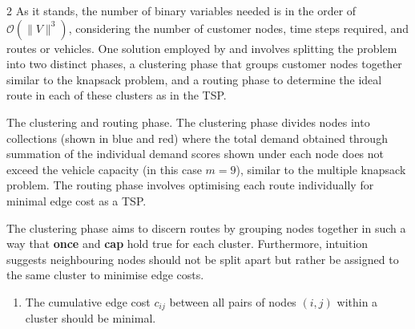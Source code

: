 \documentclass [10pt]{article}
\newcommand {\qnorm}[1] {\lVert #1 \rVert}
\begin{document}
\begin {multicols}{2}
As it stands, the number of binary variables needed is in the order of
$\mathcal{O}(\qnorm{V}^3)$, considering the number of customer nodes, time
steps required, and routes or vehicles. One solution employed by
\cite{cvrpanneal} and \cite{cvrpqaoa} involves splitting the problem
into two distinct phases, a clustering phase that groups customer nodes
together similar to the knapsack problem, and a routing phase to determine the
ideal route in each of these clusters as in the TSP.

\vspace {0.3cm}
\begin {center}

	{
	The clustering and routing phase. The clustering phase divides nodes into
	collections (shown in blue and red) where the total demand obtained 
	through summation of the individual demand scores shown under
	each node does not exceed the vehicle capacity (in this case $m = 9$),
	similar to the multiple knapsack problem. The routing phase involves
	optimising each route individually for minimal edge cost as a TSP.
}
\end {center}
\vspace {0.3cm}

The clustering phase aims to discern routes by grouping nodes together in such
a way that \textbf{once} and \textbf{cap} hold true for each cluster.
Furthermore, intuition suggests neighbouring nodes should not be split apart
but rather be assigned to the same cluster to minimise edge costs.
\begin {enumerate}[label=\textbf{cluster}, align=left]
\item The cumulative edge cost $c_{ij}$ between all pairs of
	nodes $(i, j)$ within a cluster should be minimal.
\end {enumerate}


\end{multicols}
\end{document}

